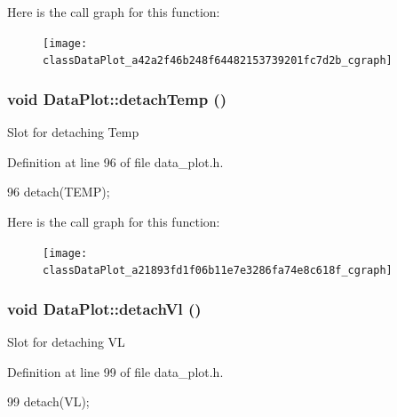 Here is the call graph for this function:\nopagebreak
\begin{figure}[H]
\begin{center}
\leavevmode
\texttt{[image: classDataPlot\_a42a2f46b248f64482153739201fc7d2b\_cgraph]}
\end{center}
\end{figure}


\hypertarget{classDataPlot_a21893fd1f06b11e7e3286fa74e8c618f}{
\subsubsection[{detachTemp}]{\setlength{\rightskip}{0pt plus 5cm}void DataPlot::detachTemp ()}}
\label{classDataPlot_a21893fd1f06b11e7e3286fa74e8c618f}
Slot for detaching Temp 

Definition at line 96 of file data\_\-plot.h.




\begin{DoxyCode}
96 { detach(TEMP); }
\end{DoxyCode}




Here is the call graph for this function:\nopagebreak
\begin{figure}[H]
\begin{center}
\leavevmode
\texttt{[image: classDataPlot\_a21893fd1f06b11e7e3286fa74e8c618f\_cgraph]}
\end{center}
\end{figure}


\hypertarget{classDataPlot_ad350cafabb24a175222744f7c7b3e10e}{
\subsubsection[{detachVl}]{\setlength{\rightskip}{0pt plus 5cm}void DataPlot::detachVl ()}}
\label{classDataPlot_ad350cafabb24a175222744f7c7b3e10e}
Slot for detaching VL 

Definition at line 99 of file data\_\-plot.h.




\begin{DoxyCode}
99 { detach(VL); }
\end{DoxyCode}




